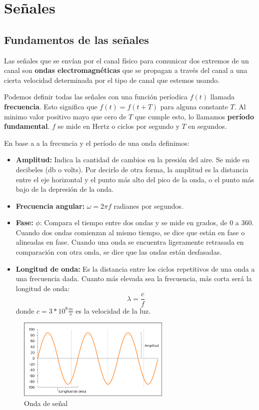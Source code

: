 \section{Señales}
\subsection{Fundamentos de las señales}
Las señales que se envían por el canal físico para comunicar dos extremos de un canal son \textbf{ondas electromagnéticas} que se propagan a través del canal a una cierta velocidad determinada por el tipo de canal que estemos usando.


Podemos definir todas las señales con una función períodica \(f(t)\) llamada \textbf{frecuencia}. Esto significa que \(f(t) = f(t + T)\) para alguna constante \(T\). Al minimo valor positivo mayo que cero de \(T\) que cumple esto, lo llamamos \textbf{período fundamental}. \(f\) se mide en Hertz o ciclos por segundo y \(T\) en segundos. 

En base a a la frecuncia y el período de una onda definimos:

\begin{itemize}
  \item \textbf{Amplitud:} Indica la cantidad de cambios en la presión del aire. Se mide en decibeles (db o volts). Por decirlo de otra forma, la amplitud es la distancia entre el eje horizontal y el punto más alto del pico de la onda, o el punto más bajo de la depresión de la onda.
  \item \textbf{Frecuencia angular:} \(\omega = 2\pi f\) radianes por segundos.
  \item \textbf{Fase:} \(\phi\): Compara el tiempo entre dos ondas y se mide en grados, de 0 a 360. Cuando dos ondas comienzan al mismo tiempo, se dice que están en fase o alineadas en fase. Cuando una onda se encuentra ligeramente retrasada en comparación con otra onda, se dice que las ondas están desfasadas.
  \item \textbf{Longitud de onda:} Es la distancia entre los ciclos repetitivos de una onda a una frecuencia dada. Cuanto más elevada sea la frecuencia, más corta será la longitud de onda: \[\lambda = \frac{c}{f}\]
  donde \(c=3*10^8\frac{m}{s}\) es la velocidad de la luz.
\end{itemize}
\begin{figure}[H]
	\centering
	\includegraphics[width=0.65\textwidth
]{images/amplitud.png}
	\caption[Onda de señal]{Onda de señal}
	\label{fig:sistema-comunicacion-real}
\end{figure}

